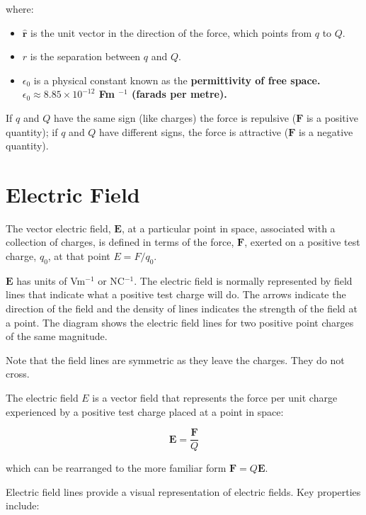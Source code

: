 \documentclass[
  letterpaper,
  DIV=11,
  numbers=noendperiod]{scrreprt}
\providecommand{\tightlist}{%
  \setlength{\itemsep}{0pt}\setlength{\parskip}{0pt}}\usepackage{longtable,booktabs,array}
\begin{document}
where:

\begin{itemize}
\tightlist
\item
  \(\hat{\mathrm{\mathbf{r}}}\) is the unit vector in the direction of
  the force, which points from \(q\) to \(Q\).
\item
  \(r\) is the separation between \(q\) and \(Q\).
\item
  \(\epsilon_0\) is a physical constant known as the
  \bf{permittivity of free space}.  $\epsilon_0 \approx 8.85 \times 10^{-12}$ Fm $^{-1}$ (farads per metre). 
\end{itemize}

If \(q\) and \(Q\) have the same sign (like charges) the force is
repulsive (\(\mathrm{\mathbf{F}}\) is a positive quantity); if \(q\) and
\(Q\) have different signs, the force is attractive
(\(\mathrm{\mathbf{F}}\) is a negative quantity).

\section{Electric Field}\label{electric-field}

The vector electric field, \(\mathbf{E}\), at a particular point in
space, associated with a collection of charges, is defined in terms of
the force, \(\mathbf{F}\), exerted on a positive test charge, \(q_0\),
at that point \(E = F/q_0\).

\(\mathbf{E}\) has units of Vm\(^{-1}\) or NC\(^{-1}\). The electric
field is normally represented by field lines that indicate what a
positive test charge will do. The arrows indicate the direction of the
field and the density of lines indicates the strength of the field at a
point. The diagram shows the electric field lines for two positive point
charges of the same magnitude.

Note that the field lines are symmetric as they leave the charges. They
do not cross.

The electric field \(\mathbf{\mathrm{𝐸}}\) is a vector field that
represents the force per unit charge experienced by a positive test
charge placed at a point in space:

\[ \mathrm{\mathbf{E}}= \frac{\mathrm{\mathbf{F}}}{Q} \]

\noindent which can be rearranged to the more familiar form
\(\mathrm{\mathbf{F}}= Q \mathrm{\mathbf{E}}\). \hspace{0pt}

Electric field lines provide a visual representation of electric fields.
Key properties include:
\end{document}
